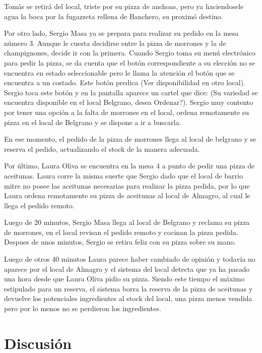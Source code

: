 \documentclass[a4paper,10pt]{article}
\begin{document}
Tom\'as se retir\'a del local, triste por su pizza de anchoas, pero ya haciendosele agua la boca por la fugazzeta rellena de Banchero, su proxim\'o destino.

Por otro lado, Sergio Masa ya se prepara para realizar su pedido en la mesa n\'umero 3. Aunque le cuesta decidirse entre la pizza de morrones
y la de champignones, decide ir con la primera. Cuando Sergio toma su men\'u electr\'onico para pedir la pizza, se da cuenta que el bot\'on 
correspondiente a su elecci\'on no se encuentra en estado seleccionable pero le llama la atenci\'on el bot\'on que se encuentra a un costado. Este
bot\'on predica (Ver disponibilidad en otro local). Sergio toca este bot\'on y en la pantalla aparece un cartel que dice: (Su variedad se encuentra
disponible en el local Belgrano, desea Ordenar?). Sergio muy contento por tener una opci\'on a la falta de morrones en el local, ordena remotamente su pizza
en el local de Belgrano y se dispone a ir a buscarla. 

En ese momento, el pedido de la pizza de morrones llega al local de belgrano y se reserva el pedido, actualizando el stock de la manera adecuada.

Por \'ultimo, Laura Oliva se encuentra en la mesa 4 a punto de pedir una pizza de aceitunas. Laura corre la misma suerte que Sergio dado que el local
de barrio mitre no posee las aceitunas necesarias para realizar la pizza pedida, por lo que Laura ordena remotamente su pizza de aceitunas al local de
Almagro, al cual le llega el pedido remoto.


Luego de 20 minutos, Sergio Masa llega al local de Belgrano y reclama su pizza de morrones, en el local revisan el pedido remoto y cocinan la pizza
pedida. Despues de unos minutos, Sergio se retira feliz con su pizza sobre su mano. 

Luego de otros 40 minutos Laura parece haber cambiado de opini\'on y todav\'ia no aparece por el local de Almagro y
el sistema del local detecta que ya ha pasado una hora desde que Laura Oliva pidio su pizza. Siendo este
tiempo el m\'aximo estipulado para un reserva, el sistema borra la reserva de la pizza de aceitunas y devuelve los potenciales ingredientes
al stock del local, una pizza menos vendida pero por lo menos no se perdieron los ingredientes.



\newpage


\section*{Discusi\'on}
\end{document}
